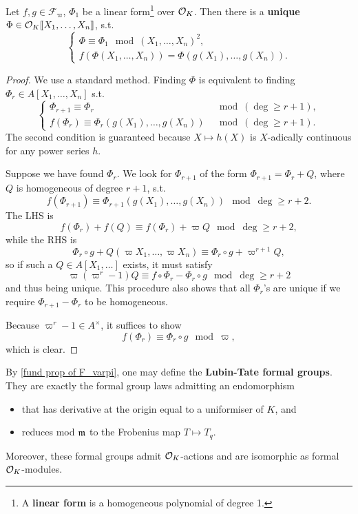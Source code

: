 \begin{lemma}\label{fund prop of F_varpi}
    Let $f, g\in\mathcal{F}_\varpi$, $\Phi_1$ be a linear form\footnote{A \textbf{linear form} is a homogeneous polynomial of degree 1.} over $\mathcal{O}_K$. Then there is a \textbf{unique} $\Phi\in\mathcal{O}_K\llbracket X_1,\dots, X_n \rrbracket$, s.t.\[\begin{cases}
        \Phi \equiv \Phi_1 \mod (X_1, \dots, X_n)^2,\\
        f(\Phi(X_1, \dots, X_n)) = \Phi(g(X_1), \dots, g(X_n)).
    \end{cases}\]
\end{lemma}
\begin{proof}
    We use a standard method. Finding $\Phi$ is equivalent to finding $\Phi_r\in A[X_1, \dots, X_n]$ s.t. \[\begin{cases}
        \Phi_{r+1} \equiv \Phi_r &\mod (\deg\ge r+1),\\
        f(\Phi_r)\equiv \Phi_r(g(X_1), \dots, g(X_n)) &\mod(\deg\ge r+1). 
    \end{cases}\]
    The second condition is guaranteed because $X\mapsto h(X)$ is $X$-adically continuous for any power series $h$.

    Suppose we have found $\Phi_r$. We look for $\Phi_{r+1}$ of the form $\Phi_{r+1} = \Phi_r + Q$, where $Q$ is homogeneous of degree $r+1$, s.t. \[f(\Phi_{r+1}) \equiv \Phi_{r+1}(g(X_1), \dots, g(X_n)) \mod \deg\ge r+2.\]
    The LHS is
    \[f(\Phi_r) + f(Q)\equiv f(\Phi_r) + \varpi Q\mod\deg\ge r+2,\]
    while the RHS is
    \[\Phi_r\circ g + Q(\varpi X_1, \dots, \varpi X_n)\equiv \Phi_r\circ g + \varpi^{r+1}Q,\]
    so if such a $Q\in A[X_1, \dots]$ exists, it must satisfy 
    \[\varpi(\varpi^r - 1)Q\equiv f\circ \Phi_r - \Phi_r\circ g\mod\deg\ge r+2\]
    and thus being unique.
    This procedure also shows that all $\Phi_r$'s are unique if we require $\Phi_{r+1} - \Phi_r$ to be homogeneous.

    Because $\varpi^r - 1\in A^\times$, it suffices to show \[f(\Phi_r) \equiv \Phi_r\circ g\mod \varpi,\] which is clear.
\end{proof}

By \cref{fund prop of F_varpi}, one may define the \textbf{Lubin-Tate formal groups}.
They are exactly the formal group laws admitting an endomorphism\begin{itemize}
    \item that has derivative at the origin equal to a uniformiser of $K$, and
    \item reduces mod $\mathfrak{m}$ to the Frobenius map $T\mapsto T_q$.
\end{itemize}
Moreover, these formal groups admit $\mathcal{O}_K$-actions and are isomorphic as formal $\mathcal{O}_K$-modules.

